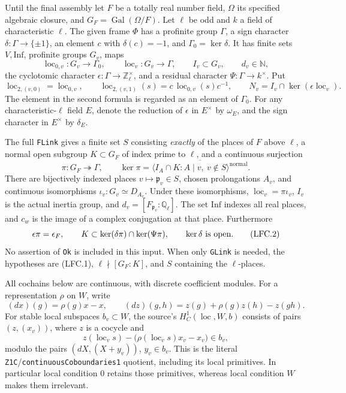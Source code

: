 Until the final assembly let \(F\) be a totally real number field,
\(\Omega\) its specified algebraic closure, and
\(G_F=\operatorname{Gal}(\Omega/F)\).  Let \(\ell\) be odd and
\(k\) a field of characteristic \(\ell\).  The given frame
\(\Phi\) has a profinite group \(\Gamma\), a sign character
\(\delta:\Gamma\to\{\pm1\}\), an element \(c\) with
\(\delta(c)=-1\), and \(\Gamma_0=\ker\delta\).
It has finite sets \(V,\mathrm{Inf}\), profinite groups \(G_v\),
maps
\[
 \operatorname{loc}_{0,v}:G_v\longrightarrow\Gamma_0,\qquad
 \operatorname{loc}_v:G_v\longrightarrow\Gamma,
 \qquad I_v\subset G_v,\qquad d_v\in\mathbb N,
\]
the cyclotomic character \(\epsilon:\Gamma\to\mathbb Z_\ell^\times\),
and a residual character \(\Psi:\Gamma\to k^\times\).
Put
\[
 \operatorname{loc}_{2,(v,0)}=\operatorname{loc}_{0,v},\qquad
 \operatorname{loc}_{2,(v,1)}(s)
       =c\,\operatorname{loc}_{0,v}(s)c^{-1},\qquad
 N_v=I_v\cap\ker(\epsilon\operatorname{loc}_v).
\]
The element in the second formula is regarded as an element of
\(\Gamma_0\).  For any characteristic-\(\ell\) field \(E\), denote
the reduction of \(\epsilon\) in \(E^\times\) by \(\omega_E\),
and the sign character in \(E^\times\) by \(\delta_E\).

The full \texttt{FLink} gives a finite set \(S\) consisting
\emph{exactly} of the places of \(F\) above \(\ell\), a normal open
subgroup \(K\subset G_F\) of index prime to \(\ell\), and a
continuous surjection
\[
 \pi:G_F\twoheadrightarrow\Gamma,\qquad
 \ker\pi=
 \overline{\langle I_A\cap K:
                  A\mid v,\ v\notin S\rangle^{\mathrm{normal}}}.
                                                        \tag{LFC.1}
\]
There are bijectively indexed places \(v\mapsto\mathfrak p_v\in S\),
chosen prolongations \(A_v\), and continuous isomorphisms
\(\iota_v:G_v\simeq D_{A_v}\).  Under these isomorphisms,
\(\operatorname{loc}_v=\pi\iota_v\), \(I_v\) is the actual inertia
group, and \(d_v=[F_{\mathfrak p_v}:\mathbb Q_\ell]\).
The set \(\mathrm{Inf}\) indexes all real places, and \(c_w\)
is the image of a complex conjugation at that place.
Furthermore
\[
 \epsilon\pi=\epsilon_F,\qquad
 K\subset\ker(\delta\pi)\cap\ker(\Psi\pi),\qquad
 \ker\delta\ \hbox{is open}.                              \tag{LFC.2}
\]
No assertion of \texttt{Ok} is included in this input.
When only \texttt{GLink} is needed, the hypotheses are (LFC.1),
\(\ell\nmid[G_F:K]\), and \(S\) containing the \(\ell\)-places.

All cochains below are continuous, with discrete coefficient
modules.  For a representation \(\rho\) on \(W\), write
\[
 (d x)(g)=\rho(g)x-x,\qquad
 (d z)(g,h)=z(g)+\rho(g)z(h)-z(gh).
\]
For stable local subspaces \(b_v\subset W\), the source's
\(H^1_C(\operatorname{loc},W,b)\) consists of pairs
\((z,(x_v))\), where \(z\) is a cocycle and
\[
 z(\operatorname{loc}_v s)
       -\bigl(\rho(\operatorname{loc}_v s)x_v-x_v\bigr)\in b_v,
                                                        \tag{LFC.3}
\]
modulo the pairs \((dX,(X+y_v))\), \(y_v\in b_v\).
This is the literal \texttt{Z1C}/\texttt{continuousCoboundaries1}
quotient, including its local primitives.  In particular local
condition \(0\) retains those primitives, whereas local condition
\(W\) makes them irrelevant.

